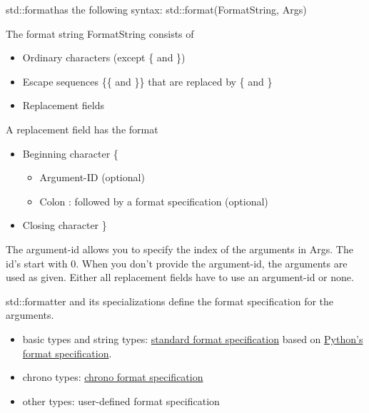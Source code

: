 std::formathas the following syntax: std::format(FormatString, Args) 

The format string FormatString consists of

\begin{itemize}
\item 
Ordinary characters (except \{ and \})

\item 
Escape sequences \{\{ and \}\} that are replaced by \{ and \}

\item 
Replacement fields
\end{itemize}

A replacement field has the format

\begin{itemize}
\item 
Beginning character \{
\begin{itemize}
\item 
Argument-ID (optional)

\item 
Colon : followed by a format specification (optional)
\end{itemize}

\item 
Closing character \}
\end{itemize}

The argument-id allows you to specify the index of the arguments in Args. The id’s start with 0. When you don’t provide the argument-id, the arguments are used as given. Either all replacement fields have to use an argument-id or none.

std::formatter and its specializations define the format specification for the arguments.

\begin{itemize}
\item 
basic types and string types: \href{https://en.cppreference.com/w/cpp/utility/format/formatter#Standard_format_specification}{standard format specification} based on \href{https://docs.python.org/3/library/string.html#formatspec}{Python’s format specification}.

\item 
chrono types: \href{https://en.cppreference.com/w/cpp/chrono/system_clock/formatter#Format_specification}{chrono format specification}

\item 
other types: user-defined format specification
\end{itemize}



























